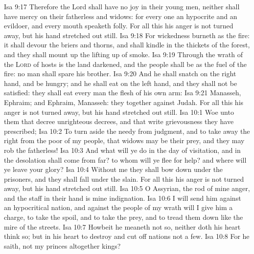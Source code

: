 \vs Isa 9:17 Therefore the Lord shall have no joy in their young men, neither shall have mercy on their fatherless and widows: for every one  an hypocrite and an evildoer, and every mouth speaketh folly. For all this his anger is not turned away, but his hand  stretched out still.
\vs Isa 9:18 For wickedness burneth as the fire: it shall devour the briers and thorns, and shall kindle in the thickets of the forest, and they shall mount up  the lifting up of smoke.
\vs Isa 9:19 Through the wrath of the \textsc{Lord} of hosts is the land darkened, and the people shall be as the fuel of the fire: no man shall spare his brother.
\vs Isa 9:20 And he shall snatch on the right hand, and be hungry; and he shall eat on the left hand, and they shall not be satisfied: they shall eat every man the flesh of his own arm:
\vs Isa 9:21 Manasseh, Ephraim; and Ephraim, Manasseh:  they together  against Judah. For all this his anger is not turned away, but his hand  stretched out still.
\vs Isa 10:1 Woe unto them that decree unrighteous decrees, and that write grievousness  they have prescribed;
\vs Isa 10:2 To turn aside the needy from judgment, and to take away the right from the poor of my people, that widows may be their prey, and  they may rob the fatherless!
\vs Isa 10:3 And what will ye do in the day of visitation, and in the desolation  shall come from far? to whom will ye flee for help? and where will ye leave your glory?
\vs Isa 10:4 Without me they shall bow down under the prisoners, and they shall fall under the slain. For all this his anger is not turned away, but his hand  stretched out still.
\vs Isa 10:5 O Assyrian, the rod of mine anger, and the staff in their hand is mine indignation.
\vs Isa 10:6 I will send him against an hypocritical nation, and against the people of my wrath will I give him a charge, to take the spoil, and to take the prey, and to tread them down like the mire of the streets.
\vs Isa 10:7 Howbeit he meaneth not so, neither doth his heart think so; but  in his heart to destroy and cut off nations not a few.
\vs Isa 10:8 For he saith,  not my princes altogether kings?

